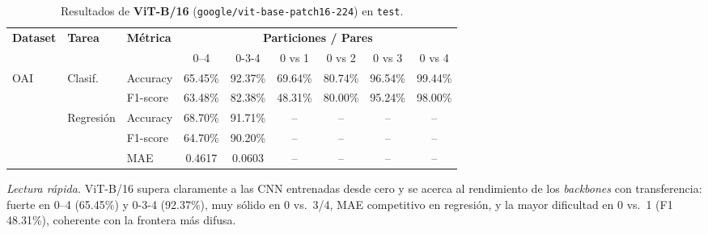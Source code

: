 \documentclass[11pt,spanish,listoffigures,listoftables]{tfgetsinf}
\begin{document}
\begin{table}[H]
	\centering
	\caption{Resultados de \textbf{ViT-B/16} (\texttt{google/vit-base-patch16-224}) en \texttt{test}.}
	\label{tab:vit_base_results}
	\begin{tabular}{@{} l l l c c c c c c @{}}
		\toprule
		\textbf{Dataset} & \textbf{Tarea}                                   & \textbf{Métrica}
		                 & \multicolumn{6}{c}{\textbf{Particiones / Pares}}                                                                                \\
		\cmidrule(lr){4-9}
		                 &                                                  &                  & 0--4    & 0-3-4   & 0 vs 1  & 0 vs 2  & 0 vs 3  & 0 vs 4  \\
		\midrule
		\multirow{2}{*}{OAI}
		                 & Clasif.                                          & Accuracy         & 65.45\% & 92.37\% & 69.64\% & 80.74\% & 96.54\% & 99.44\% \\
		                 &                                                  & F1-score         & 63.48\% & 82.38\% & 48.31\% & 80.00\% & 95.24\% & 98.00\% \\
		\addlinespace
		\multirow{3}{*}{OAI}
		                 & Regresión                                        & Accuracy         & 68.70\% & 91.71\% & --      & --      & --      & --      \\
		                 &                                                  & F1-score         & 64.70\% & 90.20\% & --      & --      & --      & --      \\
		                 &                                                  & MAE              & 0.4617  & 0.0603  & --      & --      & --      & --      \\
		\bottomrule
	\end{tabular}
\end{table}

\emph{Lectura rápida.} ViT-B/16 supera claramente a las CNN entrenadas desde cero y se acerca al rendimiento de los \emph{backbones} con transferencia: fuerte en 0--4 (65.45\%) y 0-3-4 (92.37\%), muy sólido en 0 vs.\ 3/4, MAE competitivo en regresión, y la mayor dificultad en 0 vs.\ 1 (F1 48.31\%), coherente con la frontera más difusa.
\end{document}
